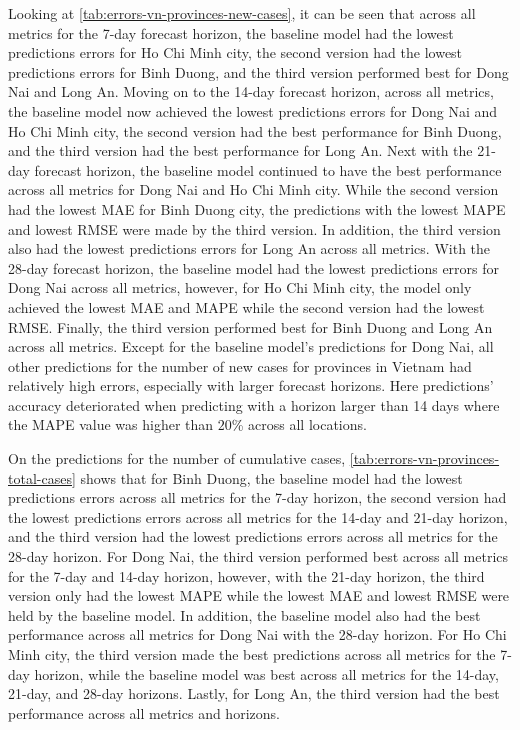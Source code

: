 Looking at \autoref{tab:errors-vn-provinces-new-cases}, it can be seen that across all metrics for the 7-day forecast horizon, the baseline model had the lowest predictions errors for Ho Chi Minh city, the second version had the lowest predictions errors for Binh Duong, and the third version performed best for Dong Nai and Long An.
Moving on to the 14-day forecast horizon, across all metrics, the baseline model now achieved the lowest predictions errors for Dong Nai and Ho Chi Minh city, the second version had the best performance for Binh Duong, and the third version had the best performance for Long An.
Next with the 21-day forecast horizon, the baseline model continued to have the best performance across all metrics for Dong Nai and Ho Chi Minh city.
While the second version had the lowest \gls{MAE} for Binh Duong city, the predictions with the lowest \gls{MAPE} and lowest \gls{RMSE} were made by the third version.
In addition, the third version also had the lowest predictions errors for Long An across all metrics.
With the 28-day forecast horizon, the baseline model had the lowest predictions errors for Dong Nai across all metrics, however, for Ho Chi Minh city, the model only achieved the lowest \gls{MAE} and \gls{MAPE} while the second version had the lowest \gls{RMSE}.
Finally, the third version performed best for Binh Duong and Long An across all metrics.
Except for the baseline model's predictions for Dong Nai, all other predictions for the number of new cases for provinces in Vietnam had relatively high errors, especially with larger forecast horizons.
Here predictions' accuracy deteriorated when predicting with a horizon larger than 14 days where the \gls{MAPE} value was higher than $20$\% across all locations.

On the predictions for the number of cumulative cases, \autoref{tab:errors-vn-provinces-total-cases} shows that for Binh Duong, the baseline model had the lowest predictions errors across all metrics for the 7-day horizon, the second version had the lowest predictions errors across all metrics for the 14-day and 21-day horizon, and the third version had the lowest predictions errors across all metrics for the 28-day horizon.
For Dong Nai, the third version performed best across all metrics for the 7-day and 14-day horizon, however, with the 21-day horizon, the third version only had the lowest \gls{MAPE} while the lowest \gls{MAE} and lowest \gls{RMSE} were held by the baseline model.
In addition, the baseline model also had the best performance across all metrics for Dong Nai with the 28-day horizon.
For Ho Chi Minh city, the third version made the best predictions across all metrics for the 7-day horizon, while the baseline model was best across all metrics for the 14-day, 21-day, and 28-day horizons.
Lastly, for Long An, the third version had the best performance across all metrics and horizons.

